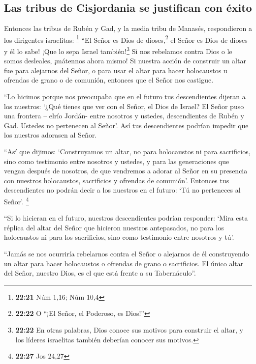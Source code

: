 \hypertarget{las-tribus-de-cisjordania-se-justifican-con-uxe9xito}{%
\subsection{Las tribus de Cisjordania se justifican con
éxito}\label{las-tribus-de-cisjordania-se-justifican-con-uxe9xito}}

 Entonces las tribus de Rubén y Gad, y la media tribu de
Manasés, respondieron a los dirigentes israelitas: \footnote{\textbf{22:21}
  Núm 1,16; Núm 10,4}  ``El Señor es Dios de
dioses,\footnote{\textbf{22:22} O ``¡El Señor, el Poderoso, es Dios!''}
el Señor es Dios de dioses y él lo sabe! ¡Que lo sepa Israel
también!\footnote{\textbf{22:22} En otras palabras, Dios conoce sus
  motivos para construir el altar, y los líderes israelitas también
  deberían conocer sus motivos.} Si nos rebelamos contra Dios o le somos
desleales, ¡mátennos ahora mismo!  Si nuestra acción de
construir un altar fue para alejarnos del Señor, o para usar el altar
para hacer holocaustos u ofrendas de grano o de comunión, entonces que
el Señor nos castigue.

 ``Lo hicimos porque nos preocupaba que en el futuro tus
descendientes dijeran a los nuestros: `¿Qué tienes que ver con el Señor,
el Dios de Israel?  El Señor puso una frontera -- elrío
Jordán- entre nosotros y ustedes, descendientes de Rubén y Gad. Ustedes
no pertenecen al Señor'. Así tus descendientes podrían impedir que los
nuestros adorasen al Señor.

 ``Así que dijimos: `Construyamos un altar, no para
holocaustos ni para sacrificios,  sino como testimonio
entre nosotros y ustedes, y para las generaciones que vengan después de
nosotros, de que vendremos a adorar al Señor en su presencia con
nuestros holocaustos, sacrificios y ofrendas de comunión'. Entonces tus
descendientes no podrán decir a los nuestros en el futuro: `Tú no
perteneces al Señor'. \footnote{\textbf{22:27} Jos 24,27}

 ``Si lo hicieran en el futuro, nuestros descendientes
podrían responder: `Mira esta réplica del altar del Señor que hicieron
nuestros antepasados, no para los holocaustos ni para los sacrificios,
sino como testimonio entre nosotros y tú'.

 ``Jamás se nos ocurriría rebelarnos contra el Señor o
alejarnos de él construyendo un altar para hacer holocaustos o ofrendas
de grano o sacrificios. El único altar del Señor, nuestro Dios, es el
que está frente a su Tabernáculo''.

